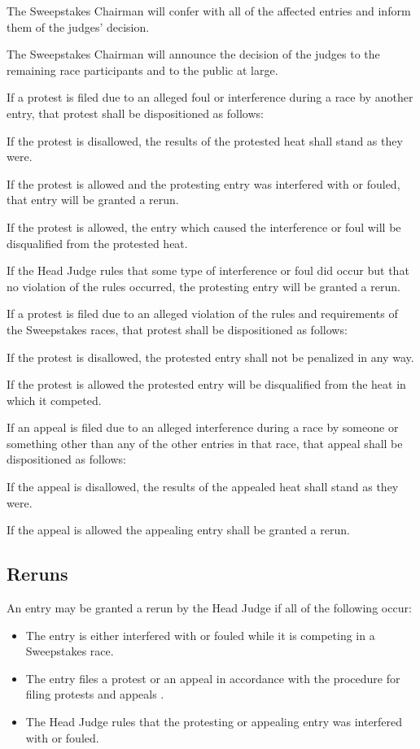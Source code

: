 	The Sweepstakes Chairman will confer with all of the affected entries and
	inform them of the judges' decision.

	The Sweepstakes Chairman will announce the decision of the judges to the
	remaining race participants and to the public at large.

	If a protest is filed due to an alleged foul or interference during a race by
	another entry, that protest shall be dispositioned as follows:

	If the protest is disallowed, the results of the protested heat shall stand as
	they were.

	If the protest is allowed and the protesting entry was interfered with or
	fouled, that entry will be granted a rerun.

	If the protest is allowed, the entry which caused the interference or foul will
	be disqualified from the protested heat.

	If the Head Judge rules that some type of interference or foul did occur but
	that no violation of the rules occurred, the protesting entry will be granted a
	rerun.

	If a protest is filed due to an alleged violation of the rules and requirements
	of the Sweepstakes races, that protest shall be dispositioned as follows:

	If the protest is disallowed, the protested entry shall not be penalized in any
	way.

	If the protest is allowed the protested entry will be disqualified from the
	heat in which it competed.

	If an appeal is filed due to an alleged interference during a race by someone
	or something other than any of the other entries in that race, that appeal
	shall be dispositioned as follows:

	If the appeal is disallowed, the results of the appealed heat shall stand as
	they were.

	If the appeal is allowed the appealing entry shall be granted a rerun.

\subsection{Reruns}

	An entry may be granted a rerun by the Head Judge if all of the following
	occur:
		
	\begin{itemize}

		\item The entry is either interfered with or fouled while it is competing
		in a Sweepstakes race.

		\item The entry files a protest or an appeal in accordance with the
		procedure for filing protests and appeals .

		\item The Head Judge rules that the protesting or appealing entry was
		interfered with or fouled.

	\end{itemize}

